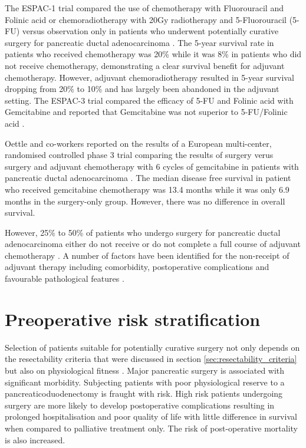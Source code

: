 The ESPAC-1 trial compared the use of chemotherapy with Fluorouracil and Folinic acid or chemoradiotherapy with 20Gy radiotherapy and 5-Fluorouracil (5-FU) versus observation only in patients who underwent potentially curative surgery for pancreatic ductal adenocarcinoma \parencite{neoptolemos_randomized_2004}. 
The 5-year survival rate in patients who received chemotherapy was 20\% while it was 8\% in patients who did not receive chemotherapy, demonstrating a clear survival benefit for adjuvant chemotherapy. 
However, adjuvant chemoradiotherapy resulted in 5-year survival dropping from 20\% to 10\% and has largely been abandoned in the adjuvant setting. 
The ESPAC-3 trial compared the efficacy of 5-FU and Folinic acid with Gemcitabine and reported that Gemcitabine was not superior to 5-FU/Folinic acid \parencite{neoptolemos_adjuvant_2010}.


Oettle and co-workers reported on the results of a European multi-center, randomised controlled phase 3 trial comparing the results of surgery verus surgery and adjuvant chemotherapy with 6 cycles of gemcitabine in patients with pancreatic ductal adenocarcinoma \parencite{oettle_adjuvant_2007}. The median disease free survival in patient who received gemcitabine chemotherapy was 13.4 months while it was only 6.9 months in the surgery-only group. However, there was no difference in overall survival.

However, 25\% to 50\% of patients who undergo surgery for pancreatic ductal adenocarcinoma either do not receive or do not complete a full course of adjuvant chemotherapy \parencite{sohn_resected_2000, neoptolemos_randomized_2004, oettle_adjuvant_2007}. 
A number of factors have been identified for the non-receipt of adjuvant therapy including comorbidity, postoperative complications and favourable pathological features \parencite{spitz_preoperative_1997, aloia_delayed_2007, oettle_adjuvant_2007, merchant_adjuvant_2009, russ_impact_2009}. 

\section{Preoperative risk stratification}
\label{sec:comorbidity_risk_stratification}

Selection of patients suitable for potentially curative surgery not only depends on the resectability criteria that were discussed in section \ref{sec:resectability_criteria} but also on physiological fitness \parencite{bilimoria_national_2007, sandroussi_sociodemographics_2010}. 
Major pancreatic surgery is associated with significant morbidity. 
Subjecting patients with poor physiological reserve to a pancreaticoduodenectomy is fraught with risk. 
High risk patients undergoing surgery are more likely to develop postoperative complications resulting in prolonged hospitalisation and poor quality of life with little difference in survival when compared to palliative treatment only.
The risk of post-operative mortality is also increased.

